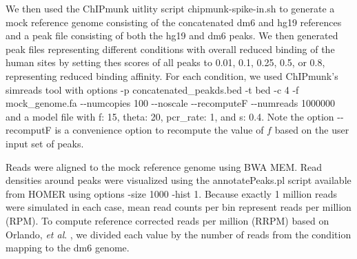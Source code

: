 \documentclass[12pt]{article}
\begin{document}
We then used the ChIPmunk uitlity script chipmunk-spike-in.sh to generate a mock reference genome consisting of the concatenated dm6 and hg19 references and a peak file consisting of both the hg19 and dm6 peaks. We then generated peak files representing different conditions with overall reduced binding of the human sites by setting thes scores of all peaks to 0.01, 0.1, 0.25, 0.5, or 0.8, representing reduced binding affinity.
For each condition, we used ChIPmunk's simreads tool with options -p concatenated\_peakds.bed -t bed -c 4 -f mock\_genome.fa -{}-numcopies 100 -{}-noscale -{}-recomputeF -{}-numreads 1000000 and a model file with f: 15, theta: 20, pcr\_rate: 1, and s: 0.4. Note the option -{}-recomputF is a convenience option to recompute the value of $f$ based on the user input set of peaks.

Reads were aligned to the mock reference genome using BWA MEM. Read densities around peaks were visualized using the annotatePeaks.pl script available from HOMER \cite{HOMER} using options -size 1000 -hist 1.
Because exactly 1 million reads were simulated in each case, mean read counts per bin represent reads per million (RPM).
To compute reference corrected reads per million (RRPM) based on Orlando, \emph{et al}. \cite{spikein}, we divided each value by the number of reads from the condition mapping to the dm6 genome.



\end{document}
